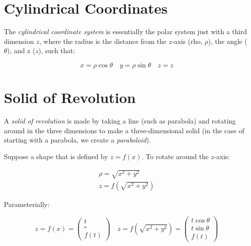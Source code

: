 \documentclass[00_complete]{subfiles}
\begin{document}
\section{Cylindrical Coordinates}

The \emph{cylindrical coordinate system} is essentially the polar system just with a
third dimension $z$, where the radius is the distance from the $z$-axis (rho,
$\rho$), the angle ($\theta$), and z ($z$), such that:

$$x = \rho \cos \theta \quad y = \rho \sin \theta \quad z = z$$

\section{Solid of Revolution}

A \emph{solid of revolution} is made by taking a line (such as parabola) and rotating
around in the three dimensions to make a three-dimensional solid (in the case of
starting with a parabola, we create a \emph{paraboloid}).

Suppose a shape that is defined by $z=f(x)$. To rotate around the $z$-axis:

$$
\begin{gathered}
    \rho=\sqrt{x^2+y^2} \\
    z=f\left(\sqrt{x^2+y^2}\right)
\end{gathered}
$$

Parameterially:

$$z=f(x) = \begin{pmatrix}
    t \\ \square \\ f(t)
\end{pmatrix}
\quad
z=f\left(\sqrt{x^2+y^2}\right) = \begin{pmatrix}
    t \cos \theta \\ t \sin \theta \\ f(t)
\end{pmatrix}$$
\end{document}
